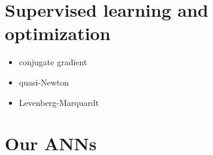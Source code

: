 \section{Supervised learning and optimization}
\label{sec:supervisedlearningandoptimization}

\begin{itemize}
  \item{conjugate gradient }
  \item{quasi-Newton}
  \item{Levenberg-Marquardt}
\end{itemize}

\section{Our ANNs}
\label{sec:ouranns}

